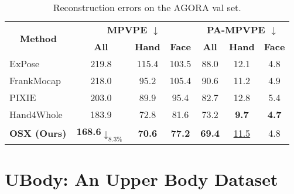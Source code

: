 \documentclass[10pt,twocolumn,letterpaper]{article}
\begin{document}
\begin{table}[h]
\centering
  \resizebox{\linewidth}{!}
{
    \begin{tabular}{l|ccc|ccc}
    \toprule
    \multicolumn{1}{c|}{\multirow{2}[4]{*}{\textbf{Method}}} & \multicolumn{3}{c|}{\boldmath{}\textbf{MPVPE $\downarrow$}\unboldmath{}} & \multicolumn{3}{c}{\boldmath{}\textbf{PA-MPVPE $\downarrow$}\unboldmath{}}\\
    \cmidrule{2-7}
    & \textbf{All} & \textbf{Hand} & \textbf{Face} & \textbf{All} & \textbf{Hand} & \textbf{Face} \\
    \midrule
ExPose~\cite{PavlakosGeorgios2020expose} &219.8 & 115.4 & 103.5 & 88.0 & 12.1 & 4.8 \\
    FrankMocap~\cite{Rong_2021frank} & 218.0 & 95.2 & 105.4 & 90.6 &11.2 &4.9  \\
    PIXIE~\cite{Feng_2021_pixie} &203.0 & 89.9 & 95.4 & 82.7 & 12.8  & 5.4  \\
    Hand4Whole~\cite{GyeongsikMoon2020hand4whole} &183.9 &	72.8	&81.6 & 73.2 & \textbf{9.7} &	\textbf{4.7} \\
    \textbf{OSX (Ours)} &	\textbf{168.6\color{Red}$\downarrow_{8.3\%}$}&	\textbf{70.6}&	\textbf{77.2} & \textbf{69.4}&	\underline{11.5}& 4.8 \\
    \bottomrule
    \end{tabular}}
    \vspace{-0.2cm}
  \caption[]{Reconstruction errors on the AGORA val set.}
  \label{tab:agora_val}\vspace{-0.7cm}
\end{table}

\section{UBody: An Upper Body Dataset}
\label{sec:ubody_intro}
\end{document}
